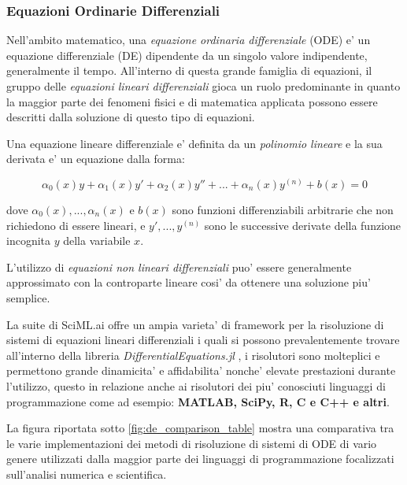\subsubsection*{Equazioni Ordinarie Differenziali}
Nell'ambito matematico, una \emph{equazione ordinaria differenziale} (ODE) e' un 
equazione differenziale (DE) dipendente da un singolo valore indipendente, 
generalmente il tempo. All'interno di questa grande famiglia di equazioni, 
il gruppo delle \emph{equazioni lineari differenziali} gioca un ruolo predominante
in quanto la maggior parte dei fenomeni fisici e di matematica applicata possono 
essere descritti dalla soluzione di questo tipo di equazioni. 

Una equazione lineare differenziale e' definita da un \emph{polinomio lineare} 
e la sua derivata e' un equazione dalla forma:

$$\alpha_0(x)y + \alpha_1(x)y' + \alpha_2(x)y'' + ... + \alpha_n(x)y^{(n)} + b(x) = 0$$

dove $\alpha_0(x), ..., \alpha_n(x)$ e $b(x)$ sono funzioni differenziabili arbitrarie che non 
richiedono di essere lineari, e $y', ..., y^{(n)}$ sono le successive derivate della funzione incognita
$y$ della variabile $x$.

L'utilizzo di \emph{equazioni non lineari differenziali} puo' essere 
generalmente approssimato con la controparte lineare cosi' da ottenere una 
soluzione piu' semplice. 

La suite di SciML.ai offre un ampia varieta' di framework per la risoluzione di sistemi di 
equazioni lineari differenziali i quali si possono prevalentemente trovare 
all'interno della libreria \emph{DifferentialEquations.jl} \cite{rackauckas2017differentialequations}
\cite{rackauckas2019confederated} \cite{9622796} \cite{gowda2019sparsity},
i risolutori sono molteplici e permettono grande dinamicita' e affidabilita' 
nonche' elevate prestazioni durante l'utilizzo, questo in relazione anche ai risolutori dei piu' 
conosciuti linguaggi di programmazione come ad esempio: \textbf{MATLAB, SciPy, R, C e C++ e altri}.

La figura riportata sotto \ref{fig:de_comparison_table} \cite{10.15200/winn.153459.98975} mostra una comparativa tra le varie implementazioni dei 
metodi di risoluzione di sistemi di ODE di vario genere utilizzati dalla maggior
parte dei linguaggi di programmazione focalizzati sull'analisi numerica e scientifica.


